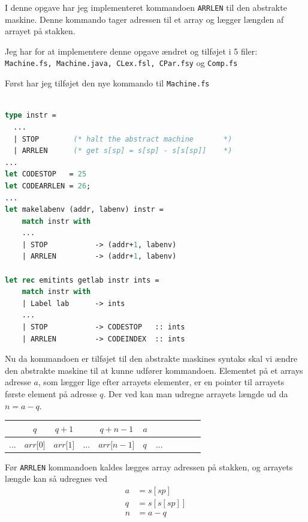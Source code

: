 \documentclass[danish,a4paper]{report}
\begin{document}
I denne opgave har jeg implementeret kommandoen \texttt{ARRLEN} til den abstrakte maskine. Denne kommando tager adressen til et array og lægger længden af arrayet på stakken.

Jeg har for at implementere denne opgave ændret og tilføjet i 5 filer: \texttt{Machine.fs, Machine.java, CLex.fsl, CPar.fsy} og \texttt{Comp.fs}

Først har jeg tilføjet den nye kommando til \texttt{Machine.fs}

\begin{lstlisting}[language=ML]

type instr =
  ...
  | STOP        (* halt the abstract machine       *)
  | ARRLEN      (* get s[sp] = s[sp] - s[s[sp]]    *)
...
let CODESTOP   = 25
let CODEARRLEN = 26;
...
let makelabenv (addr, labenv) instr = 
    match instr with
    ...
    | STOP           -> (addr+1, labenv)
    | ARRLEN         -> (addr+1, labenv)

let rec emitints getlab instr ints = 
    match instr with
    | Label lab      -> ints
    ...
    | STOP           -> CODESTOP   :: ints
    | ARRLEN         -> CODEINDEX  :: ints
\end{lstlisting}

Nu da kommandoen er tilføjet til den abstrakte maskines syntaks skal vi ændre den abstrakte maskine til at kunne udfører kommandoen. Elementet på et arrays adresse $a$, som lægger lige efter arrayets elementer, er en pointer til arrayets første element på adresse $q$. Der ved kan man udregne arrayets længde ud da $n = a-q$.\\

\begin{table}[h]
\centering
\begin{tabular}{ccccccccccc}
& $q$ & $q+1$ & & $q+n-1$ & $a$ & \\  \hline
\multicolumn{1}{l|}{...} & \multicolumn{1}{l|}{$arr{[}0{]}$} & \multicolumn{1}{l|}{$arr{[}1{]}$} & \multicolumn{1}{l|}{...} & \multicolumn{1}{l|}{$arr{[}n-1{]}$} & \multicolumn{1}{l|}{$q$} & ... \\ \hline
\end{tabular}
\end{table}

Før \texttt{ARRLEN} kommandoen kaldes lægges array adressen på stakken, og arrayets længde kan så udregnes ved
\begin{align*}
a &= s[sp]\\
q &= s[s[sp]]\\
n &= a - q\\
\end{align*}\\
\end{document}
